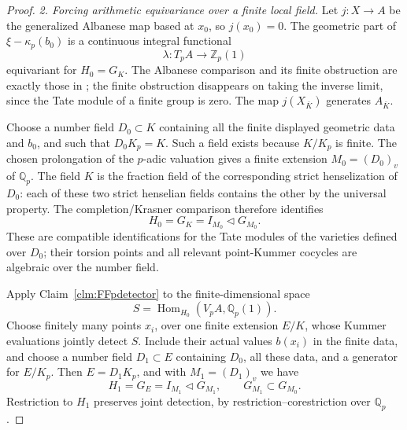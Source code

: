 \begin{proof}
\emph{2. Forcing arithmetic equivariance over a finite local field.}
Let \(j:X\to A\) be the generalized Albanese map based
at \(x_0\), so \(j(x_0)=0\). The geometric part of
\(\xi-\kappa_p(b_0)\) is a continuous integral functional
\[
                  \lambda:T_pA\longrightarrow\mathbb Z_p(1)
\]
equivariant for \(H_0=G_K\). The Albanese comparison and
its finite obstruction are exactly those in
\citet[Proposition~4.1 and Corollary~4.2]{FF_SpiessSzamuely2003};
the finite obstruction disappears on taking the inverse
limit, since the Tate module of a finite group is zero.
The map \(j(X_{\bar K})\) generates \(A_{\bar K}\).

Choose a number field \(D_0\subset K\) containing all
the finite displayed geometric data and \(b_0\), and
such that \(D_0K_p=K\). Such a field exists because
\(K/K_p\) is finite. The chosen prolongation of the
\(p\)-adic valuation gives a finite extension
\(M_0=(D_0)_v\) of \(\mathbb Q_p\). The field \(K\)
is the fraction field of the corresponding strict
henselization of \(D_0\): each of these two strict
henselian fields contains the other by the universal
property. The completion/Krasner comparison therefore
identifies
\[
                  H_0=G_K=I_{M_0}\triangleleft G_{M_0}.
                                                               \tag{FF.26.2}
\]
These are compatible identifications for the Tate modules
of the varieties defined over \(D_0\); their torsion
points and all relevant point-Kummer cocycles are algebraic
over the number field.

Apply Claim~\ref{clm:FFpdetector} to the finite-dimensional
space
\[
                  S=\operatorname{Hom}_{H_0}
                       (V_pA,\mathbb Q_p(1)).
\]
Choose finitely many points \(x_i\), over one finite
extension \(E/K\), whose Kummer evaluations jointly
detect \(S\). Include their actual values \(b(x_i)\)
in the finite data, and choose a number field
\(D_1\subset E\) containing \(D_0\), all these data,
and a generator for \(E/K_p\). Then
\(E=D_1K_p\), and with \(M_1=(D_1)_v\) we have
\[
        H_1=G_E=I_{M_1}\triangleleft G_{M_1},
                  \qquad G_{M_1}\subset G_{M_0}.         \tag{FF.26.3}
\]
Restriction to \(H_1\) preserves joint detection,
by restriction--corestriction over \(\mathbb Q_p\).


\end{proof}
